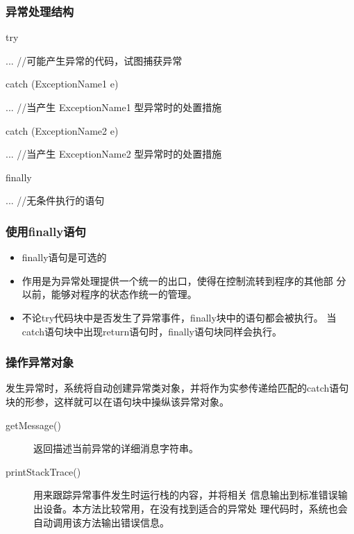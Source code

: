 \begin{frame}[fragile] %
  \frametitle{异常处理结构}


  \begin{javaCode}
    try {
      ... //可能产生异常的代码，试图捕获异常
      
    } catch (ExceptionName1 e) {
      ... //当产生 ExceptionName1 型异常时的处置措施
      
    } catch (ExceptionName2 e) {
      ... //当产生 ExceptionName2 型异常时的处置措施
      
    } finally {
      ... //无条件执行的语句
      
    }
  \end{javaCode}


\end{frame}

\begin{frame}[fragile] %
  \frametitle{使用finally语句}

  \begin{itemize}
  \item finally语句是可选的
  \item 作用是为异常处理提供一个统一的出口，使得在控制流转到程序的其他部
    分以前，能够对程序的状态作统一的管理。
  \item 不论try代码块中是否发生了异常事件，finally块中的语句都会被执行。
    当catch语句块中出现return语句时，finally语句块同样会执行。
  \end{itemize}
\end{frame}

\begin{frame}[fragile] %
  \frametitle{操作异常对象}

  发生异常时，系统将自动创建异常类对象，并将作为实参传递给匹配的catch语句
  块的形参，这样就可以在语句块中操纵该异常对象。

  \pause
  

  \begin{description}
  \item[getMessage()] 返回描述当前异常的详细消息字符串。
  \item[printStackTrace()] 用来跟踪异常事件发生时运行栈的内容，并将相关
    信息输出到标准错误输出设备。本方法比较常用，在没有找到适合的异常处
    理代码时，系统也会自动调用该方法输出错误信息。
  \end{description}
\end{frame}

